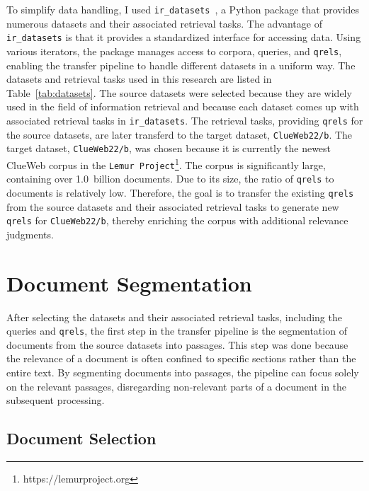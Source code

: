 To simplify data handling, I used \texttt{ir\_datasets}~\citep{macavaney:2021}, a Python package that provides numerous datasets and their associated retrieval tasks. The advantage of \texttt{ir\_datasets} is that it provides a standardized interface for accessing data. Using various iterators, the package manages access to corpora, queries, and \texttt{qrels}, enabling the transfer pipeline to handle different datasets in a uniform way. The datasets and retrieval tasks used in this research are listed in Table~\ref{tab:datasets}. The source datasets were selected because they are widely used in the field of information retrieval and because each dataset comes up with associated retrieval tasks in \texttt{ir\_datasets}. The retrieval tasks, providing \texttt{qrels} for the source datasets, are later transferd to the target dataset, \texttt{ClueWeb22/b}. The target dataset, \texttt{ClueWeb22/b}, was chosen because it is currently the newest ClueWeb corpus in the \texttt{Lemur Project}\footnote{https://lemurproject.org}. The corpus is significantly large, containing over 1.0~billion documents. Due to its size, the ratio of \texttt{qrels} to documents is relatively low. Therefore, the goal is to transfer the existing \texttt{qrels} from the source datasets and their associated retrieval tasks to generate new \texttt{qrels} for \texttt{ClueWeb22/b}, thereby enriching the corpus with additional relevance judgments. 


\section{Document Segmentation}\label{document-segmentation}

After selecting the datasets and their associated retrieval tasks, including the queries and \texttt{qrels}, the first step in the transfer pipeline is the segmentation of documents from the source datasets into passages. This step was done because the relevance of a document is often confined to specific sections rather than the entire text. By segmenting documents into passages, the pipeline can focus solely on the relevant passages, disregarding non-relevant parts of a document in the subsequent processing.

\subsection{Document Selection}\label{document-selection}

